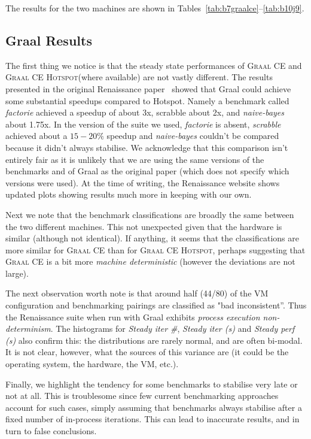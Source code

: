 \documentclass[a4paper]{article}
\newcommand{\graalce}{\textsc{Graal CE}\xspace}
\newcommand{\graalcehs}{\textsc{Graal CE Hotspot}\xspace}
\begin{document}
The results for the two machines are shown in
Tables~\ref{tab:b7graalce}--\ref{tab:b10j9}.

\subsection{Graal Results}

The first thing we notice is that the steady state performances
of \graalce and \graalcehs (where available) are not vastly different. The results
presented in the original Renaissance paper~\cite{prokopec19renaissance} showed
that Graal could achieve some substantial speedups compared to Hotspot. Namely
a benchmark called \emph{factorie} achieved a speedup of about 3x, scrabble
about 2x, and \emph{naive-bayes} about 1.75x. In the version of the suite we
used, \emph{factorie} is absent, \emph{scrabble} achieved about a $15-20\%$
speedup and \emph{naive-bayes} couldn't be compared because it
didn't always stabilise. We acknowledge that this comparison isn't entirely
fair as it is unlikely that we are using the same versions of the benchmarks
and of Graal as the original paper (which does not specify which versions were
used). At the time of writing, the Renaissance website shows updated plots
showing results much more in keeping with our own.

Next we note that the benchmark classifications are broadly the same between
the two different machines. This not unexpected given that the hardware is
similar (although not identical). If anything, it seems that the
classifications are more similar for \graalce than for \graalcehs, perhaps
suggesting that \graalce is a bit more \emph{machine deterministic} (however
the deviations are not large).

The next observation worth note is that around half (44/80) of the VM
configuration and benchmarking pairings are classified as "bad inconsistent''.
Thus the Renaissance suite when run with Graal exhibits \emph{process execution non-determinism}. The histograms for \emph{Steady iter \#}, \emph{Steady
iter (s)} and \emph{Steady perf (s)} also confirm this: the distributions are rarely
normal, and are often bi-modal. It is not clear, however, what the sources of
this variance are (it could be the operating system, the hardware, the VM, etc.).

Finally, we highlight the tendency for some benchmarks to stabilise very late
or not at all. This is troublesome since few current benchmarking approaches
account for such cases, simply assuming that benchmarks always stabilise after
a fixed number of in-process iterations. This can lead to inaccurate results,
and in turn to false conclusions.
\end{document}

